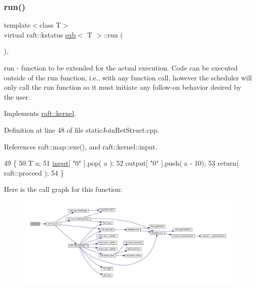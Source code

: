 \subsubsection{\texorpdfstring{run()}{run()}\hspace{0.1cm}{\footnotesize\ttfamily [8/12]}}
{\footnotesize\ttfamily template$<$class T$>$ \\
virtual raft\+::kstatus \hyperlink{classsub}{sub}$<$ T $>$\+::run (\begin{DoxyParamCaption}{ }\end{DoxyParamCaption})\hspace{0.3cm}{\ttfamily [inline]}, {\ttfamily [virtual]}}

run -\/ function to be extended for the actual execution. Code can be executed outside of the run function, i.\+e., with any function call, however the scheduler will only call the run function so it must initiate any follow-\/on behavior desired by the user. 

Implements \hyperlink{classraft_1_1kernel_a05094286d7577360fb1b91c91fc05901}{raft\+::kernel}.



Definition at line 48 of file static\+Join\+Ret\+Struct.\+cpp.



References raft\+::map\+::exe(), and raft\+::kernel\+::input.


\begin{DoxyCode}
49     \{
50         T a;
51         \hyperlink{classraft_1_1kernel_a6edbe35a56409d402e719b3ac36d6554}{input}[ \textcolor{stringliteral}{"0"} ].pop( a );
52         output[ \textcolor{stringliteral}{"0"} ].push( a - 10);
53         \textcolor{keywordflow}{return}( raft::proceed );
54     \}
\end{DoxyCode}
Here is the call graph for this function\+:
\nopagebreak
\begin{figure}[H]
\begin{center}
\leavevmode
\includegraphics[width=350pt]{classsub_a0a0c7461433ee8b5f4b24305282bf69a_cgraph}
\end{center}
\end{figure}
\hypertarget{classsub_a0a0c7461433ee8b5f4b24305282bf69a}{}\label{classsub_a0a0c7461433ee8b5f4b24305282bf69a} 

